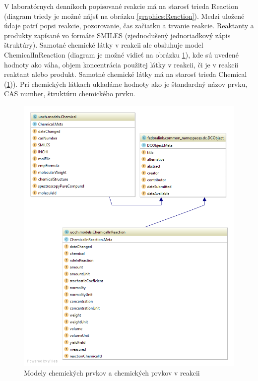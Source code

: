 \documentclass[thesis=M,slovak]{FITthesis}[2013/05/06]
\begin{document}
V laboratórnych denníkoch popisované reakcie má na starosť trieda Reaction (diagram triedy je možné nájsť na obrázku \ref{graphics:Reaction}). Medzi uložené údaje patrí popsi reakcie, pozorovanie, čas začiatku a trvanie reakcie. Reaktanty a produkty zapísané vo formáte SMILES (zjednodušený jednoriadkový zápis štruktúry). Samotné chemické látky v reakcii ale obsluhuje model ChemicalInReaction (diagram je možné vidieť na obrázku \ref{graphics:Chemical}), kde sú uvedené hodnoty ako váha, objem koncentrácia použitej látky v reakcii, či je v reakcii reaktant alebo produkt. Samotné chemické látky má na starosť trieda Chemical (\ref{graphics:Chemical})). Pri chemických látkach ukladáme hodnoty ako je štandardný názov prvku, CAS number, štruktúru chemického prvku.

\begin{figure}\centering
	\includegraphics[width=1.0\textwidth]{diagramy/UOCH_Chemical.png}
 	\caption[Modely chemických prvkov a chemických prvkov v reakcii]{Modely chemických prvkov a chemických prvkov v reakcii}\label{graphics:Chemical}
\end{figure}
\end{document}
